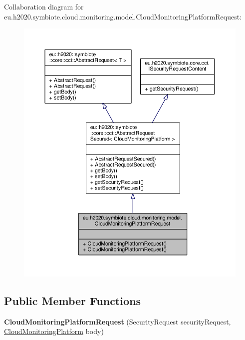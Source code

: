 Collaboration diagram for eu.\+h2020.\+symbiote.\+cloud.\+monitoring.\+model.\+Cloud\+Monitoring\+Platform\+Request\+:
\nopagebreak
\begin{figure}[H]
\begin{center}
\leavevmode
\includegraphics[width=350pt]{classeu_1_1h2020_1_1symbiote_1_1cloud_1_1monitoring_1_1model_1_1CloudMonitoringPlatformRequest__coll__graph}
\end{center}
\end{figure}
\subsection*{Public Member Functions}
\begin{DoxyCompactItemize}
\item 
\mbox{\label{classeu_1_1h2020_1_1symbiote_1_1cloud_1_1monitoring_1_1model_1_1CloudMonitoringPlatformRequest_a2edc55f74302b3ec8ab1d599aebe4995}} 
{\bfseries Cloud\+Monitoring\+Platform\+Request} (Security\+Request security\+Request, \hyperlink{classeu_1_1h2020_1_1symbiote_1_1cloud_1_1monitoring_1_1model_1_1CloudMonitoringPlatform}{Cloud\+Monitoring\+Platform} body)
\end{DoxyCompactItemize}


